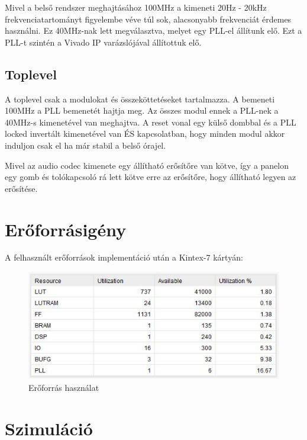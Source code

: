 \documentclass[a4paper,11pt]{article}
\begin{document}
Mivel a belső rendszer meghajtásához 100MHz a kimeneti 20Hz - 20kHz frekvenciatartományt figyelembe véve túl sok, alacsonyabb frekvenciát érdemes használni. Ez 40MHz-nak lett megválasztva, melyet egy PLL-el állítunk elő. Ezt a PLL-t szintén a Vivado IP varázslójával állítottuk elő.

\subsection{Toplevel}

A toplevel csak a modulokat és összeköttetéseket tartalmazza. A bemeneti 100MHz a PLL bemenetét hajtja meg. Az összes modul ennek a PLL-nek a 40MHz-s kimenetével van meghajtva. A reset vonal egy külső dombbal és a PLL locked invertált kimenetével van ÉS kapcsolatban, hogy minden modul akkor induljon csak el ha már stabil a belső órajel.

Mivel az audio codec kimenete egy állítható erősítőre van kötve, így a panelon egy gomb és tolókapcsoló rá lett kötve erre az erősítőre, hogy állítható legyen az erősítése.

\section{Erőforrásigény}

A felhasznált erőforrások implementáció után a Kintex-7 kártyán:

\begin{figure}[h!]
	\begin{center}
		\includegraphics[scale=1]{util.JPG}	
	\end{center}
	\caption{Erőforrás használat}
	\label{a:usagestat}
\end{figure}

\section{Szimuláció}
\end{document}
